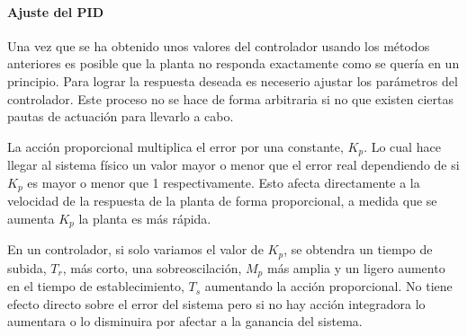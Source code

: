 \documentclass{book}
\begin{document}

		\paragraph{Ajuste del PID}

Una vez que se ha obtenido unos valores del controlador usando los m\'etodos anteriores es posible que la planta no responda exactamente como se quer\'ia en un principio. Para lograr la respuesta deseada es neceserio ajustar los par\'ametros del controlador. Este proceso no se hace de forma arbitraria si no que existen ciertas pautas de actuaci\'on para llevarlo a cabo. \par

La acci\'on proporcional multiplica el error por una constante, $K_p$. Lo cual hace llegar al sistema f\'isico un valor mayor o menor que el error real dependiendo de si $K_p$ es mayor o menor que 1 respectivamente. Esto afecta directamente a la velocidad de la respuesta de la planta de forma proporcional, a medida que se aumenta $K_p$ la planta es m\'as r\'apida. \par

En un controlador, si solo variamos el valor de $K_p$, se obtendra un tiempo de subida, $T_r$, m\'as corto, una sobreoscilaci\'on, $M_p$ m\'as amplia y un ligero aumento en el tiempo de establecimiento, $T_s$ aumentando la acci\'on proporcional. No tiene efecto directo sobre el error del sistema pero si no hay acci\'on integradora lo aumentara o lo disminuira por afectar a la ganancia del sistema. \par
\end{document}
